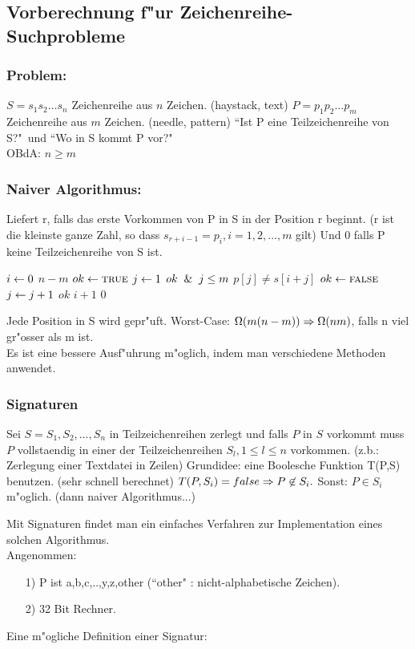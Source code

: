 \documentclass[a4paper,twoside,DIV15,BCOR12mm]{scrbook}
\begin{document}
\subsection{Vorberechnung f"ur Zeichenreihe-Suchprobleme}
\subsubsection*{Problem:}	
 $S=s_1 s_2 \dots s_n$ Zeichenreihe aus $n$ Zeichen. (haystack, text)
 $P=p_1 p_2 \dots p_m$ Zeichenreihe aus $m$ Zeichen. (needle, pattern)
 ``Ist P eine Teilzeichenreihe von S?"\ und ``Wo in S kommt P vor?"\\
 OBdA: $n \ge m$\\
 \subsubsection*{Naiver Algorithmus:}
 Liefert r, falls das erste Vorkommen von P in S in der Position r beginnt. (r ist die kleinste ganze Zahl, so dass $s_{r+i-1}=p_i, i=1,2,\dots,m$ gilt) Und 0 falls P keine Teilzeichenreihe von S ist.
 
 \begin{codebox}
 \li \For $i \leftarrow 0$ \To $n-m$ 
 \li \Do
 \li $ok \leftarrow \textnormal{\scshape true}$
 \li $j \leftarrow 1$
 \li \While $ok \And j \le m$ 
 \li 	\Do \If $p[j] \ne s[i+j]$ 
 \li 		$ok \leftarrow \textnormal{\scshape false}$
 \li	\Else $j\leftarrow j+1$
 		\End
 	\End
 \li \If $ok$ \Return $i+1$
 \End
 \li \Return $0$
 \end{codebox}
 Jede Position in S wird gepr"uft. Worst-Case: $\Omega(m(n-m))\Rightarrow\Omega(nm)$, falls n viel gr"osser als m ist.\\
 Es ist eine bessere Ausf"uhrung m"oglich, indem man verschiedene Methoden anwendet.
 \subsubsection*{Signaturen}
 Sei $S=S_1,S_2,\dots,S_n$ in  Teilzeichenreihen zerlegt und falls $P$ in $S$ vorkommt muss $P$ vollstaendig in einer der Teilzeichenreihen $S_l, 1 \le l \le n$ vorkommen. (z.b.: Zerlegung einer Textdatei in Zeilen)
 Grundidee: eine Boolesche Funktion T(P,S) benutzen. (sehr schnell berechnet)
 $T(P,S_i)=false \Rightarrow P \not\in S_i.$
 Sonst: $P \in S_i$ m"oglich. (dann naiver Algorithmus...)
 
 Mit Signaturen findet man ein einfaches Verfahren zur Implementation eines solchen Algorithmus.\\
 Angenommen:
 \begin{itemize}
 \item[1)] P ist {a,b,c,..,y,z,other} (``other" : nicht-alphabetische Zeichen).
 \item[2)] 32 Bit Rechner.
 \end{itemize}
 Eine m"ogliche Definition einer Signatur:
\end{document}
